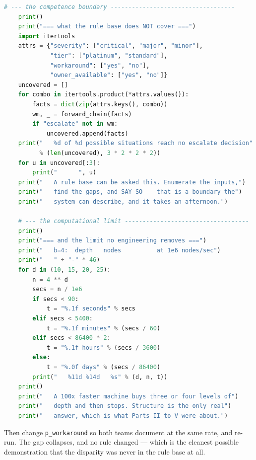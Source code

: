 \begin{lab}
\begin{lstlisting}[language=Python]
    # --- the competence boundary -----------------------------------
    print()
    print("=== what the rule base does NOT cover ===")
    import itertools
    attrs = {"severity": ["critical", "major", "minor"],
             "tier": ["platinum", "standard"],
             "workaround": ["yes", "no"],
             "owner_available": ["yes", "no"]}
    uncovered = []
    for combo in itertools.product(*attrs.values()):
        facts = dict(zip(attrs.keys(), combo))
        wm, _ = forward_chain(facts)
        if "escalate" not in wm:
            uncovered.append(facts)
    print("   %d of %d possible situations reach no escalate decision"
          % (len(uncovered), 3 * 2 * 2 * 2))
    for u in uncovered[:3]:
        print("      ", u)
    print("   A rule base can be asked this. Enumerate the inputs,")
    print("   find the gaps, and SAY SO -- that is a boundary the")
    print("   system can describe, and it takes an afternoon.")

    # --- the computational limit -----------------------------------
    print()
    print("=== and the limit no engineering removes ===")
    print("   b=4:  depth   nodes          at 1e6 nodes/sec")
    print("   " + "-" * 46)
    for d in (10, 15, 20, 25):
        n = 4 ** d
        secs = n / 1e6
        if secs < 90:
            t = "%.1f seconds" % secs
        elif secs < 5400:
            t = "%.1f minutes" % (secs / 60)
        elif secs < 86400 * 2:
            t = "%.1f hours" % (secs / 3600)
        else:
            t = "%.0f days" % (secs / 86400)
        print("   %11d %14d   %s" % (d, n, t))
    print()
    print("   A 100x faster machine buys three or four levels of")
    print("   depth and then stops. Structure is the only real")
    print("   answer, which is what Parts II to V were about.")
\end{lstlisting}
Then change \texttt{p\_workaround} so both teams document at the same rate, and
re-run. The gap collapses, and no rule changed --- which is the cleanest possible
demonstration that the disparity was never in the rule base at all.
\end{lab}

